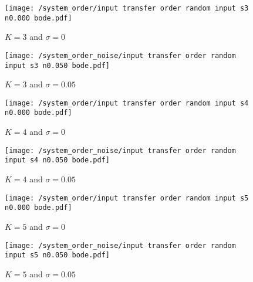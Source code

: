 \begin{example}
\begin{minipage}{1\textwidth}
       \medskip
       \begin{subfigure}{0.495\textwidth}
           \centering
           \texttt{[image: /system\_order/input transfer order random input s3 n0.000 bode.pdf]}
           \caption{$K = 3$ and $\sigma = 0$}
           \label{subfigapp:tf_order_g}
       \end{subfigure}
       \hfill
       \begin{subfigure}{0.495\textwidth}
           \centering
           \texttt{[image: /system\_order\_noise/input transfer order random input s3 n0.050 bode.pdf]}
           \caption{$K = 3$ and $\sigma = 0.05$}
           \label{subfigapp:tf_order_h}
       \end{subfigure}
       \vspace{1em}
\end{minipage}
\newpage
\begin{minipage}{1\textwidth}
\vspace{1em}
       \begin{subfigure}{0.495\textwidth}
           \centering
           \texttt{[image: /system\_order/input transfer order random input s4 n0.000 bode.pdf]}
           \caption{$K = 4$ and $\sigma = 0$}
           \label{subfigapp:tf_order_i}
       \end{subfigure}
       \hfill 
       \begin{subfigure}{0.495\textwidth}
           \centering
           \texttt{[image: /system\_order\_noise/input transfer order random input s4 n0.050 bode.pdf]}
           \caption{$K = 4$ and $\sigma = 0.05$}
           \label{subfigapp:tf_order_j}
       \end{subfigure}
       \hfill 
       
       \medskip                   
       \begin{subfigure}{0.495\textwidth}
           \centering
           \texttt{[image: /system\_order/input transfer order random input s5 n0.000 bode.pdf]}
           \caption{$K = 5$ and $\sigma = 0$}
           \label{subfigapp:tf_order_k}
       \end{subfigure}
       \hfill
       \begin{subfigure}{0.495\textwidth}
           \centering
           \texttt{[image: /system\_order\_noise/input transfer order random input s5 n0.050 bode.pdf]}
           \caption{$K = 5$ and $\sigma = 0.05$}
           \label{subfigapp:tf_order_l}
       \end{subfigure}
       \hfill
       

\end{minipage}
\end{example}
